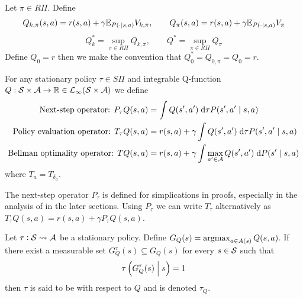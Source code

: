 \begin{defn}
  Let $\pi \in R\Pi$.
  Define
  \[ Q_{k, \pi}(s, a) = r(s, a) + \gamma \mathbb{E}_{P(\cdot \mid s, a)} V_{k, \pi}
  ,\qquad Q_\pi(s, a) = r(s, a) + \gamma \mathbb{E}_{P(\cdot \mid s, a)} V_\pi \]
  \[ Q^*_k = \sup_{\pi \in R\Pi} Q_{k, \pi}
  , \qquad Q^* = \sup_{\pi \in R\Pi} Q_\pi \]
  Define $Q_0 = r$ then we make the convention that
  $Q^*_0 = Q_{0,\pi} = Q_0 = r$.
  \label{defn:polEvalQ}
\end{defn}

\begin{defn}
  For any stationary policy $\tau \in S\Pi$ and
  integrable Q-function $Q:\mathcal{S} \times \mathcal{A} \to \mathbb{R}
  \in \mathcal{L}_\infty(\mathcal{S} \times \mathcal{A})$ we define
  \begin{align*}
    \text{Next-step operator: }
    P_\tau Q(s, a) &= \int Q(s', a') \; \mathrm{d} \tau P(s', a' \mid s, a)
    \\ \text{Policy evaluation operator: }
    T_\tau Q(s, a) &= 
    r(s, a) + \gamma \int Q(s', a') \; \mathrm{d} \tau P(s', a' \mid s, a)
    \\ \text{Bellman optimality operator: }
      T Q(s, a) &= r(s, a) + \gamma
    \int \max_{a' \in \mathcal{A}} Q(s', a') \; \mathrm{d} P(s' \mid s, a)
  \end{align*}
  where $T_a = T_{\delta_a}$.
  \label{defn:opQ}
\end{defn}
\begin{rem}
  The next-step operator $P_\tau$
  is defined for simplications in proofs, especially
  in the analysis of  in the later sections.
  Using $P_\tau$ we can write $T_\tau$ alternatively as
  $T_\tau Q(s, a) = r(s, a) + \gamma P_\tau Q (s, a)$.
\end{rem}
\begin{defn}
  Let $\tau : \mathcal{S} \leadsto \mathcal{A}$ be a stationary policy. Define
  $G_Q(s) = \operatorname*{argmax}_{a \in A(s)} Q(s, a)$.
  If there exist a measurable set $G_Q^\tau(s) \subseteq G_Q(s)$
  for every $s \in \mathcal{S}$ such that
  \[ \tau \left( G_Q^\tau(s) \;\middle\vert\; s \right) = 1 \]
  then $\tau$ is said to be  with respect to $Q$ and is
  denoted $\tau_Q$.
  \label{defn:greedyQ}
\end{defn}

